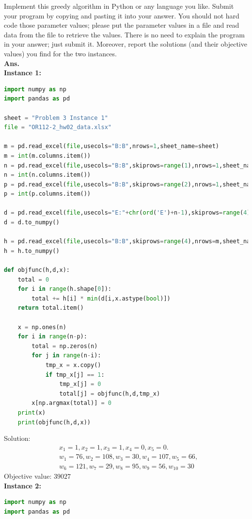 \documentclass[12pt]{article}
\begin{document}
\begin{enumerate}
\begin{enumerate}
                        Implement this greedy algorithm in Python or any language you like. Submit your program by copying and pasting it into your answer. You should not hard code those parameter values; please put the parameter values in a file and read data from the file to retrieve the values. There is no need to explain the program in your answer; just submit it. Moreover, report the solutions (and their objective values) you find for the two instances.\\
                        \textbf{Ans.}\\
                        \textbf{Instance 1:}
                        \begin{lstlisting}[language=Python]
import numpy as np
import pandas as pd

sheet = "Problem 3 Instance 1"
file = "OR112-2_hw02_data.xlsx"

m = pd.read_excel(file,usecols="B:B",nrows=1,sheet_name=sheet)
m = int(m.columns.item())
n = pd.read_excel(file,usecols="B:B",skiprows=range(1),nrows=1,sheet_name=sheet)
n = int(n.columns.item())
p = pd.read_excel(file,usecols="B:B",skiprows=range(2),nrows=1,sheet_name=sheet)
p = int(p.columns.item())

d = pd.read_excel(file,usecols="E:"+chr(ord('E')+n-1),skiprows=range(4),nrows=m,sheet_name=sheet)
d = d.to_numpy()

h = pd.read_excel(file,usecols="B:B",skiprows=range(4),nrows=m,sheet_name=sheet)
h = h.to_numpy()

def objfunc(h,d,x):
    total = 0
    for i in range(h.shape[0]):
        total += h[i] * min(d[i,x.astype(bool)])
    return total.item()

    x = np.ones(n)
    for i in range(n-p):
        total = np.zeros(n)
        for j in range(n-i):
            tmp_x = x.copy()
            if tmp_x[j] == 1:
                tmp_x[j] = 0
                total[j] = objfunc(h,d,tmp_x)
        x[np.argmax(total)] = 0
    print(x)
    print(objfunc(h,d,x))    
                        \end{lstlisting}
                        Solution:
                        \begin{align*}
                               & x_1 = 1, x_2 = 1, x_3 = 1, x_4 = 0, x_5 = 0.         \\
                               & w_1 = 76, w_2 = 108, w_3 = 30, w_4 = 107, w_5 = 66,  \\
                               & w_6 = 121, w_7 = 29, w_8 = 95, w_9 = 56, w_{10} = 30
                        \end{align*}
                        Objective value:  $39027$\\
                        \textbf{Instance 2:}
                        \begin{lstlisting}[language=Python]
import numpy as np
import pandas as pd


\end{lstlisting}
\end{enumerate}
\end{enumerate}
\end{document}
